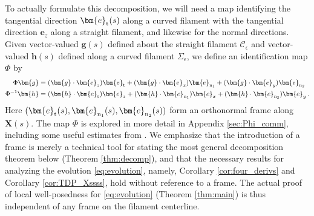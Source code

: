 \documentclass[11pt,reqno]{amsart}
\newcommand{\X}{\bm{X}}
\newcommand{\be}{\bm{e}}
\newcommand{\mc}[1]{\mathcal{#1}}
\theoremstyle{definition}
\begin{document}
To actually formulate this decomposition, we will need a map identifying the tangential direction $\be_{\rm t}(s)$ along a curved filament with the tangential direction $\be_z$ along a straight filament, and likewise for the normal directions. 
Given vector-valued $\bm{g}(s)$ defined about the straight filament $\mc{C}_\epsilon$ and vector-valued $\bm{h}(s)$ defined along a curved filament $\Sigma_\epsilon$, we define an identification map $\Phi$ by
\begin{equation}\label{eq:mapPhi_def}
\begin{aligned}
\Phi\bm{g} &= (\bm{g}\cdot\be_z)\be_{\rm t} + (\bm{g}\cdot\be_x)\be_{\rm n_1} + (\bm{g}\cdot\be_y)\be_{\rm n_2} \\
\Phi^{-1}\bm{h} &= (\bm{h}\cdot\be_{\rm t})\be_z + (\bm{h}\cdot\be_{\rm n_1})\be_x + (\bm{h}\cdot\be_{\rm n_2})\be_y\,.
\end{aligned}
\end{equation}
Here $(\be_{\rm t}(s),\be_{\rm n_1}(s),\be_{\rm n_2}(s))$ form an orthonormal frame along $\X(s)$. The map $\Phi$ is explored in more detail in Appendix \ref{sec:Phi_comm}, including some useful estimates from \cite{ohm2024free}. We emphasize that the introduction of a frame is merely a technical tool for stating the most general decomposition theorem below (Theorem \ref{thm:decomp}), and that the necessary results for analyzing the evolution \eqref{eq:evolution}, namely, Corollary \ref{cor:four_derivs} and Corollary \ref{cor:TDP_Xssss}, hold without reference to a frame. The actual proof of local well-posedness for \eqref{eq:evolution} (Theorem \ref{thm:main}) is thus independent of any frame on the filament centerline. 
\end{document}
